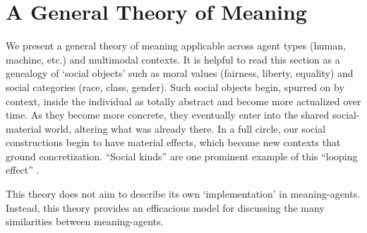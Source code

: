 \section{A General Theory of Meaning}\label{sec:theory}

We present a general theory of meaning applicable across agent types (human, machine, etc.) and multimodal contexts. 
It is helpful to read this section as a genealogy of `social objects' such as moral values (fairness, liberty, equality) and social categories (race, class, gender).
Such social objects begin, spurred on by context, inside the individual as totally abstract and become more actualized over time.
As they become more concrete, they eventually enter into the shared social-material world, altering what was already there.
In a full circle, our social constructions begin to have material effects, which become new contexts that ground concretization.
``Social kinds'' are one prominent example of this ``looping effect'' \citep{Hacking:LoopingEffects}.

This theory does not aim to describe its own `implementation' in meaning-agents. 
Instead, this theory provides an efficacious model for discussing the many similarities between meaning-agents.


